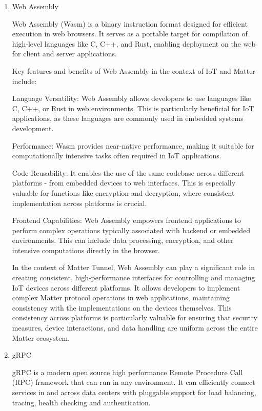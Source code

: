 \documentclass[conference]{IEEEtran}
\begin{document}
\begin{enumerate}[itemsep=2ex, parsep=1ex]
	\item Web Assembly
	      	      
	      Web Assembly (Wasm) is a binary instruction format designed for efficient
	      execution in web browsers. It serves as a portable target for compilation of
	      high-level languages like C, C++, and Rust, enabling deployment on the web
	      for client and server applications.
	      	      
	      Key features and benefits of Web Assembly in the context of IoT and Matter
	      include:
	      	      
	      Language Versatility: Web Assembly allows developers to use languages like
	      C, C++, or Rust in web environments. This is particularly beneficial for
	      IoT applications, as these languages are commonly used in embedded systems
	      development.
	      	      
	      Performance: Wasm provides near-native performance, making it suitable for
	      computationally intensive tasks often required in IoT applications.
	      	      
	      Code Reusability: It enables the use of the same codebase across different
	      platforms - from embedded devices to web interfaces. This is especially valuable
	      for functions like encryption and decryption, where consistent
	      implementation across platforms is crucial.
	      	      
	      Frontend Capabilities: Web Assembly empowers frontend applications to perform
	      complex operations typically associated with backend or embedded environments.
	      This can include data processing, encryption, and other intensive
	      computations directly in the browser.
	      	      
	      In the context of Matter Tunnel, Web Assembly can play a significant role in
	      creating consistent, high-performance interfaces for controlling and
	      managing IoT devices across different platforms. It allows developers to implement
	      complex Matter protocol operations in web applications, maintaining
	      consistency with the implementations on the devices themselves. This consistency
	      across platforms is particularly valuable for ensuring that security measures,
	      device interactions, and data handling are uniform across the entire Matter
	      ecosystem.
	      	      
	\item gRPC
	      	      
	      gRPC is a modern open source high performance Remote Procedure Call (RPC)
	      framework that can run in any environment. It can efficiently connect services
	      in and across data centers with pluggable support for load balancing,
	      tracing, health checking and authentication.
	      	      

\end{enumerate}
\end{document}
